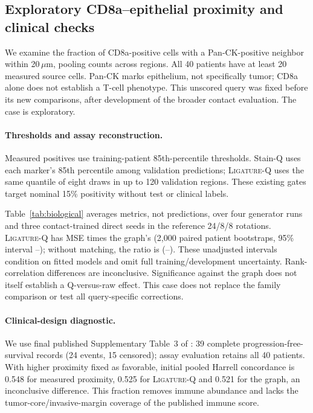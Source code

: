 \documentclass[10pt,letterpaper]{article}
\theoremstyle{definition}
\theoremstyle{remark}
\newcommand{\method}{\textnormal{\textsc{Ligature}}}
\begin{document}
\subsection{Exploratory CD8a--epithelial proximity and clinical checks}
\label{app:biological}
We examine the fraction of CD8a-positive cells with a Pan-CK-positive neighbor within 20\,$\mu$m, pooling counts across regions. All 40 patients have at least 20 measured source cells. Pan-CK marks epithelium, not specifically tumor; CD8a alone does not establish a T-cell phenotype. This unscored query was fixed before its new comparisons, after development of the broader contact evaluation. The case is exploratory.

\paragraph{Thresholds and assay reconstruction.} Measured positives use training-patient 85th-percentile thresholds. Stain-Q uses each marker's 85th percentile among validation predictions; \method{}-Q uses the same quantile of eight draws in up to 120 validation regions. These existing gates target nominal 15\% positivity without test or clinical labels.

Table~\ref{tab:biological} averages metrics, not predictions, over four generator runs and three contact-trained direct seeds in the reference 24/8/8 rotations. \method{}-Q has MSE \BioContactRatio{} times the graph's (2,000 paired patient bootstraps, 95\% interval \BioContactLo--\BioContactHi); without matching, the ratio is \BioRawRatio{} (\BioRawLo--\BioRawHi). These unadjusted intervals condition on fitted models and omit full training/development uncertainty. Rank-correlation differences are inconclusive. Significance against the graph does not itself establish a Q-versus-raw effect. This case does not replace the family comparison or test all query-specific corrections.

\begin{table}[!htp]
\centering
\caption{CD8a--epithelial proximity recovery, all 40 held-out patients. MSE is relative to the raw stain; smaller is better. Metrics average runs. Q denotes validation-quantile gates.}
\label{tab:biological}

\end{table}

\paragraph{Clinical-design diagnostic.} We use final published Supplementary Table~3 of \citet{orion2023}: 39 complete progression-free-survival records (24 events, 15 censored); assay evaluation retains all 40 patients. With higher proximity fixed as favorable, initial pooled Harrell concordance is 0.548 for measured proximity, 0.525 for \method{}-Q and 0.521 for the graph, an inconclusive difference. This fraction removes immune abundance and lacks the tumor-core/invasive-margin coverage of the published immune score.
\end{document}
